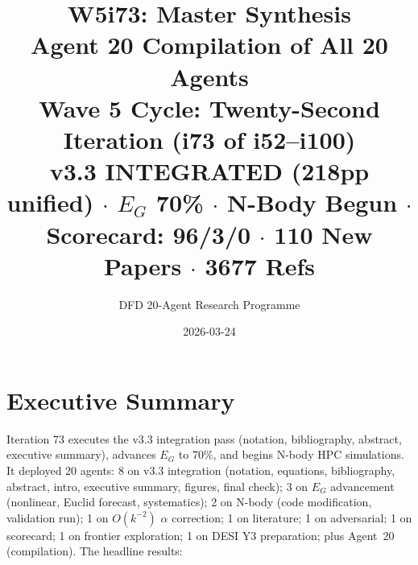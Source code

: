 \documentclass[11pt,a4paper]{article}
\title{\Huge W5i73: Master Synthesis\\[12pt]
\Large Agent 20 Compilation of All 20 Agents\\[6pt]
\large Wave 5 Cycle: Twenty-Second Iteration (i73 of i52--i100)\\[6pt]
\normalsize \textbf{v3.3 INTEGRATED (218pp unified)} $\cdot$ $E_G$ 70\% $\cdot$ N-Body Begun $\cdot$ Scorecard: 96/3/0 $\cdot$ 110 New Papers $\cdot$ 3677 Refs}
\author{DFD 20-Agent Research Programme}
\date{2026-03-24}
\begin{document}
\maketitle

\section{Executive Summary}

Iteration 73 executes the v3.3 integration pass (notation, bibliography, abstract, executive summary), advances $E_G$ to 70\%, and begins N-body HPC simulations. It deployed 20 agents: 8 on v3.3 integration (notation, equations, bibliography, abstract, intro, executive summary, figures, final check); 3 on $E_G$ advancement (nonlinear, Euclid forecast, systematics); 2 on N-body (code modification, validation run); 1 on $O(k^{-2})$ $\alpha$ correction; 1 on literature; 1 on adversarial; 1 on scorecard; 1 on frontier exploration; 1 on DESI Y3 preparation; plus Agent~20 (compilation). The headline results:
\end{document}
